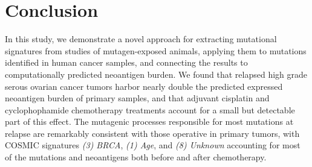 \section*{Conclusion}
In this study, we demonstrate a novel approach for extracting mutational signatures from studies of mutagen-exposed animals, applying them to mutations identified in human cancer samples, and connecting the results to computationally predicted neoantigen burden. We found that relapsed high grade serous ovarian cancer tumors harbor nearly double the predicted expressed neoantigen burden of primary samples, and that adjuvant cisplatin and cyclophophamide chemotherapy treatments account for a small but detectable part of this effect. The mutagenic processes responsible for most mutations at relapse are remarkably consistent with those operative in primary tumors, with COSMIC signatures \textit{(3) BRCA}, \textit{(1) Age}, and \textit{(8) Unknown} accounting for most of the mutations and neoantigens both before and after chemotherapy.